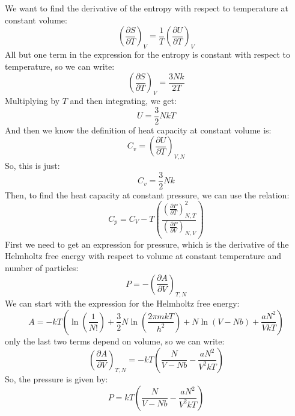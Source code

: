 \documentclass[10pt]{article}
\begin{document}
We want to find the derivative of the entropy with respect to temperature at constant volume:
\begin{equation}
  \left( \frac{\partial S}{\partial T} \right)_{V} = \frac{1}{T} \left( \frac{\partial U}{\partial T} \right)_{V}
\end{equation}
All but one term in the expression for the entropy is constant with respect to temperature, so we can write:
\begin{equation}
  \left( \frac{\partial S}{\partial T} \right)_{V} = \frac{3Nk}{2T}
\end{equation}
Multiplying by $T$ and then integrating, we get:
\begin{equation}
  U = \frac{3}{2}NkT
\end{equation}
And then we know the definition of heat capacity at constant volume is:
\begin{equation}
  C_{v} = \left( \frac{\partial U}{\partial T} \right)_{V,N}
\end{equation}
So, this is just:
\begin{equation}
  C_{v} = \frac{3}{2}Nk
\end{equation}
Then, to find the heat capacity at constant pressure, we can use the relation:
\begin{equation}
C_{p} = C_{V} - T \left( \frac{\left( \frac{\partial P}{\partial T} \right)_{N,T}^2}{\left( \frac{\partial P}{\partial V} \right)_{N,V}} \right)
\end{equation}
First we need to get an expression for pressure, which is the derivative of the Helmholtz free energy with respect to volume at constant temperature and number of particles:
\begin{equation}
  P = - \left( \frac{\partial A}{\partial V} \right)_{T,N}
\end{equation}
We can start with the expression for the Helmholtz free energy:
\begin{equation}
  A = - k T \left( \ln \left( \frac{1}{N !} \right) + \frac{3}{2} N \ln \left( \frac{2 \pi m k T}{h^{2}} \right) + N \ln \left( V-N b \right) + \frac{a N^{2}}{V k T} \right)
\end{equation}
only the last two terms depend on volume, so we can write:
\begin{equation}
  \left( \frac{\partial A}{\partial V} \right)_{T,N} = - k T \left( \frac{N}{V-N b} - \frac{a N^{2}}{V^{2} k T} \right)
\end{equation}
So, the pressure is given by:
\begin{equation}
  P = k T \left( \frac{N}{V-N b} - \frac{a N^{2}}{V^{2} k T} \right)
\end{equation}
\end{document}
